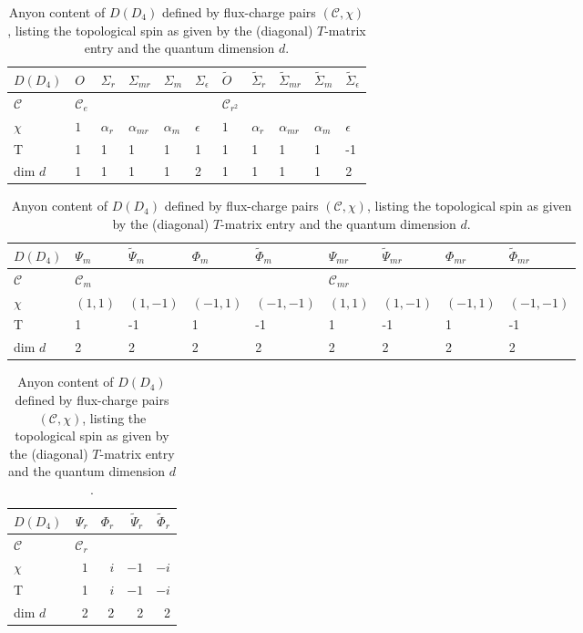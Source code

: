 \documentclass[a4paper,twocolumn,11pt]{quantumarticle}
\begin{document}
\begin{table}
\centering
\begin{subtable}{\textwidth}
\raggedright
\begin{tabular}{l||lllll|lllll}

$D(D_4)$  & $O$     & $\Sigma_{r}$ & $\Sigma_{mr}$ & $\Sigma_{m}$ & $\Sigma_{\epsilon}$ & $\tilde{O}$ & $\tilde{\Sigma}_{r}$ & $\tilde{\Sigma}_{mr}$ & $\tilde{\Sigma}_{m}$ & $\tilde{\Sigma}_{\epsilon}$ 
\\ \hline
$\mathcal C$    & $\mathcal C_e$ &       &       &       &              &   $\mathcal C_{r^2}$     &           &       &           &                \\ $\chi$ & $1$ & $\alpha_{r}$ & $\alpha_{mr}$ & $\alpha_{m}$ & $\epsilon$          & $1$     & $\alpha_{r}$         & $\alpha_{mr}$         & $\alpha_{m}$         & $\epsilon$                  \\ 
\hline 
T & 1 & 1 & 1 & 1 & 1 & 1 & 1 & 1 & 1 & -1\\
dim $d$ & 1 & 1 & 1 & 1 & 2 & 1 & 1 & 1 & 1& 2
\end{tabular}
\end{subtable}

\vspace{0.5cm}
\medskip
\begin{subtable}{\textwidth}
\begin{tabular}{l||llll|llll}
$D(D_4)$  & $\Psi_{m}$ & $\tilde{\Psi}_{m}$ & $\Phi_{m}$ & $\tilde{\Phi}_{m}$ & $\Psi_{mr}$ & $\tilde{\Psi}_{mr}$ & $\Phi_{mr}$ & $\tilde{\Phi}_{mr}$ \\ \hline
$\mathcal C$    & $\mathcal C_m$    &          &    &            & $\mathcal C_{mr}$    &           &   &           \\ %
$\chi$ & $(1,1)$    & $(1,-1)$              & $(-1,1)$    & $(-1,-1)$              &$(1,1)$    & $(1,-1)$              & $(-1,1)$    & $(-1,-1)$             \\ \hline
T  & 1 & -1 & 1 & -1 & 1 & -1 & 1 & -1 \\
dim $d$ & 2 & 2 & 2 & 2 & 2 & 2 & 2 & 2 
\end{tabular}
\end{subtable}
\medskip

\vspace{0.5cm}
\begin{subtable}{\textwidth}
\raggedright
\begin{tabular}{l||rrrr}
$D(D_4)$  & $\Psi_{r}$ &  $\Phi_{r}$ & $\tilde{\Psi}_{r}$ & $\tilde{\Phi}_{r}$ \\ \hline
$\mathcal C$    & $\mathcal C_r$    &            &    &             \\ %
$\chi$ & $1$    & $ i$              & $-1$     & $- i$   \\           %
\hline
T  & 1 & $i$ & $-1$ & $-i$ \\
dim $d$ & 2 & 2 & 2 & 2
\end{tabular}
\end{subtable} 
\caption{  Anyon content of $D(D_4)$ defined by flux-charge pairs $(\mathcal C,\chi)$, listing the topological spin as given by the (diagonal) $T$-matrix entry and the quantum dimension $d$. }\label{tab:anyons}
\end{table}
\end{document}
